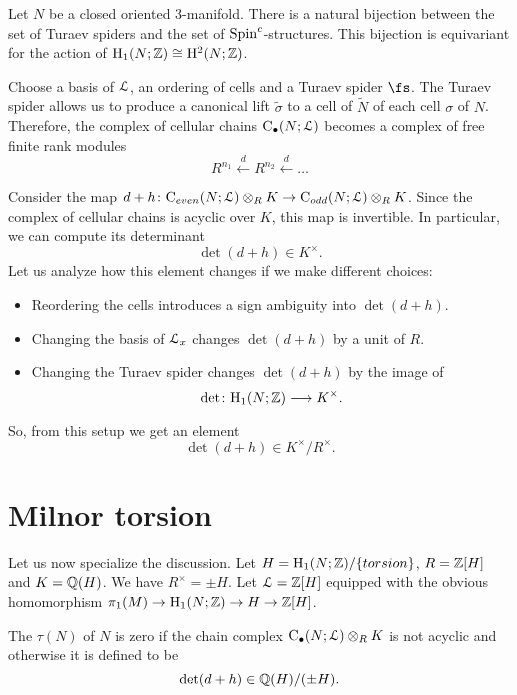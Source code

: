 \begin{prop}[Turaev]
	Let $N$ be a closed oriented 3-manifold. There is a natural bijection between the set of Turaev spiders and the set of $\mathrm{Spin}^c$-structures. This bijection is equivariant for the action of $\mathrm{H}_1(N; \mathbb{Z})\cong\mathrm{H}^2(N; \mathbb{Z})$.
\end{prop}

Choose a basis of $\mathcal{L}$, an ordering of cells and a Turaev spider $\fs$. The Turaev spider allows us to produce a canonical lift $\tilde{\sigma}$ to a cell of $\tilde{N}$ of each cell $\sigma$ of $N$. Therefore, the complex of cellular chains $\mathrm{C}_\bullet(N; \mathcal{L})$ becomes a complex of free finite rank modules
\[R^{n_1}\xleftarrow{d} R^{n_2}\xleftarrow{d} \dots\]

Consider the map $d+h\colon \mathrm{C}_{even}(N; \mathcal{L})\otimes_R K\rightarrow \mathrm{C}_{odd}(N; \mathcal{L})\otimes_R K$. Since the complex of cellular chains is acyclic over $K$, this map is invertible. In particular, we can compute its determinant
\[\det(d + h)\in K^\times.\]
Let us analyze how this element changes if we make different choices:
\begin{itemize}
	\item Reordering the cells introduces a sign ambiguity into $\det(d + h)$.
	
	\item Changing the basis of $\mathcal{L}_x$ changes $\det(d+h)$ by a unit of $R$.
	
	\item Changing the Turaev spider changes $\det(d+h)$ by the image of
	\[\det\colon \mathrm{H}_1(N; \mathbb{Z})\longrightarrow K^\times.\]
\end{itemize}

So, from this setup we get an element
\[\det(d + h)\in K^\times / R^\times.\]

\section{Milnor torsion}

Let us now specialize the discussion. Let $H=\mathrm{H}_1(N; \mathbb{Z})/\{torsion\}$, $R=\mathbb{Z}[H]$ and $K = \mathbb{Q}(H)$. We have $R^\times = \pm H$. Let $\mathcal{L} = \mathbb{Z}[H]$ equipped with the obvious homomorphism $\pi_1(M)\rightarrow \mathrm{H}_1(N; \mathbb{Z})
\rightarrow H\rightarrow \mathbb{Z}[H]$.

\begin{defn}
	The  $\tau(N)$ of $N$ is zero if the chain complex $\mathrm{C}_\bullet(N; \mathcal{L})\otimes_R K$ is not acyclic and otherwise it is defined to be
	\[\det(d + h)\in \mathbb{Q}(H) / (\pm H).\]
\end{defn}

